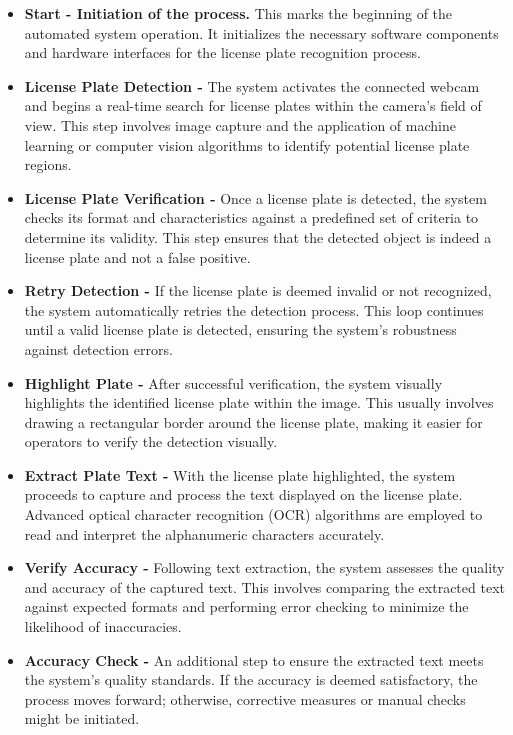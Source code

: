 \begin{itemize}
	\item \textbf{Start - Initiation of the process.} This marks the beginning of the automated system operation. It initializes the necessary software components and hardware interfaces for the license plate recognition process.
	
	\item \textbf{License Plate Detection -} The system activates the connected webcam and begins a real-time search for license plates within the camera's field of view. This step involves image capture and the application of machine learning or computer vision algorithms to identify potential license plate regions.
	
	\item \textbf{License Plate Verification -} Once a license plate is detected, the system checks its format and characteristics against a predefined set of criteria to determine its validity. This step ensures that the detected object is indeed a license plate and not a false positive.
	
	\item \textbf{Retry Detection -} If the license plate is deemed invalid or not recognized, the system automatically retries the detection process. This loop continues until a valid license plate is detected, ensuring the system's robustness against detection errors.
	
	\item \textbf{Highlight Plate -} After successful verification, the system visually highlights the identified license plate within the image. This usually involves drawing a rectangular border around the license plate, making it easier for operators to verify the detection visually.
	
	\item \textbf{Extract Plate Text -} With the license plate highlighted, the system proceeds to capture and process the text displayed on the license plate. Advanced optical character recognition (OCR) algorithms are employed to read and interpret the alphanumeric characters accurately.
	
	\item \textbf{Verify Accuracy -} Following text extraction, the system assesses the quality and accuracy of the captured text. This involves comparing the extracted text against expected formats and performing error checking to minimize the likelihood of inaccuracies.
	
	\item \textbf{Accuracy Check -} An additional step to ensure the extracted text meets the system's quality standards. If the accuracy is deemed satisfactory, the process moves forward; otherwise, corrective measures or manual checks might be initiated.
	

\end{itemize}
